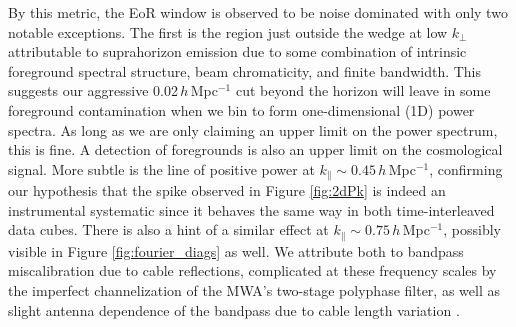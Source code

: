 By this metric, the EoR window is observed to be noise dominated with only two notable exceptions. The first is the region just outside the wedge at low $k_\perp$ attributable to suprahorizon emission due to some combination of  intrinsic foreground spectral structure, beam chromaticity, and finite bandwidth. This suggests our aggressive 0.02\,$h$\,Mpc$^{-1}$ cut beyond the horizon will leave in some foreground contamination when we bin to form one-dimensional (1D) power spectra. As long as we are only claiming an upper limit on the power spectrum, this is fine. A detection of foregrounds is also an upper limit on the cosmological signal. More subtle is the line of positive power at $k_\| \sim 0.45$\,$h$\,Mpc$^{-1}$, confirming our hypothesis that the spike observed in Figure \ref{fig:2dPk} is indeed an instrumental systematic since it behaves the same way in both time-interleaved data cubes. There is also a hint of a similar effect at $k_\| \sim 0.75$\,$h$\,Mpc$^{-1}$, possibly visible in Figure \ref{fig:fourier_diags} as well. We attribute both to bandpass miscalibration due to cable reflections, complicated at these frequency scales by the imperfect channelization of the MWA's two-stage polyphase filter, as well as slight antenna dependence of the bandpass due to cable length variation \citep{HazeltonEppsilon}.

